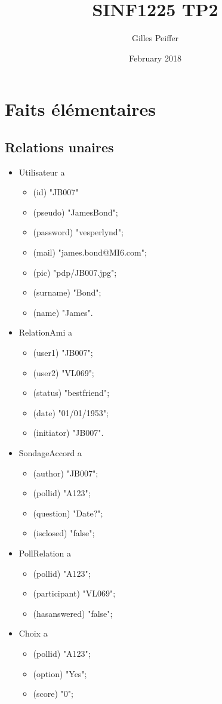 \documentclass{article}
\title{SINF1225 TP2}
\author{Gilles Peiffer}
\date{February 2018}
\begin{document}
\maketitle

\section{Faits élémentaires}

\subsection{Relations unaires}

\begin{itemize}
    \item Utilisateur a
        \begin{itemize}
        \item (id) "JB007"
        \item (pseudo) "JamesBond";
        \item (password) "vesperlynd";
        \item (mail) "james.bond@MI6.com";
        \item (pic) "pdp/JB007.jpg";
        \item (surname) "Bond";
        \item (name) "James".
    \end{itemize}
    \item RelationAmi a
    \begin{itemize}
        \item (user1) "JB007";
        \item (user2) "VL069";
        \item (status) "bestfriend";
        \item (date) "01/01/1953";
        \item (initiator) "JB007".
    \end{itemize}
    \item SondageAccord a
    \begin{itemize}
        \item (author) "JB007";
        \item (pollid) "A123";
        \item (question) "Date?";
        \item (isclosed) "false";
    \end{itemize}
    \item PollRelation a
    \begin{itemize}
        \item (pollid) "A123";
        \item (participant) "VL069";
        \item (hasanswered) "false";
    \end{itemize}
    \item Choix a
    \begin{itemize}
        \item (pollid) "A123";
        \item (option) "Yes";
        \item (score) "0";
    \end{itemize}
\end{itemize}
\end{document}
